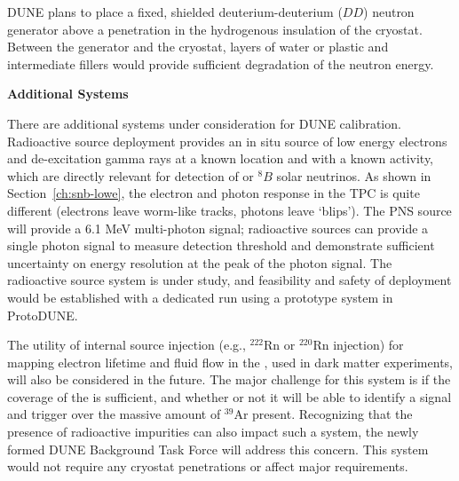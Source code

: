 DUNE plans
to place a fixed, shielded deuterium-deuterium ($DD$) neutron generator  above a penetration in the hydrogenous insulation of the  cryostat. Between the generator and the cryostat, layers of water or plastic and intermediate fillers would provide sufficient degradation of the neutron energy. 

\textbf{Additional Systems}

There are 
additional systems under consideration for DUNE calibration. Radioactive source deployment provides an in situ source of low energy electrons and de-excitation gamma rays at a known location and with a known activity, which are directly relevant for detection of  or $^{8}B$ solar neutrinos. As shown in Section~\ref{ch:snb-lowe}, the electron and photon response in the TPC is quite different (electrons leave worm-like tracks, photons leave `blips'). The PNS source will provide a 6.1 MeV multi-photon signal; radioactive sources can provide a single photon signal to measure detection threshold and demonstrate sufficient uncertainty on energy resolution at the peak of the  photon signal.  The radioactive source system is under study, and feasibility and safety of deployment would be established with a dedicated run using a prototype system in ProtoDUNE.

The utility of internal source injection (e.g., ${}^{222}$Rn or ${}^{220}$Rn injection) for mapping electron lifetime and fluid flow in the , used in dark matter experiments, will also be considered in the future. The major challenge for this system is if the 
coverage of the  is sufficient, and whether or not it will be able to identify a signal and trigger over the massive amount of ${}^{39}$Ar present. Recognizing that the presence of radioactive impurities can also impact such a system, the newly formed DUNE  Background Task Force will address this concern. This system would not require any cryostat penetrations or affect major  requirements.



